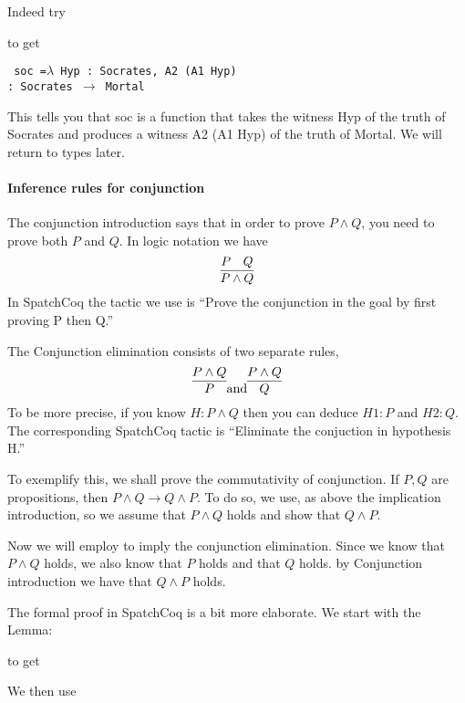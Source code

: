 \begin{itemize}
\begin{tcolorbox}[colback=red!5!white,colframe=black]
 
 \end{tcolorbox}
Indeed try

to get 

\texttt{
soc =$ \lambda$ Hyp : Socrates, A2 (A1 Hyp) \\
     : Socrates $\rightarrow$ Mortal}

This tells you  that soc is a function  that takes the witness Hyp of the truth of Socrates and produces a witness A2 (A1 Hyp) of the truth of Mortal.
 We will return to types later.





\paragraph{\bf Inference rules for conjunction}
The conjunction introduction says that in order to prove $P\land Q$, you need to prove both $P$ and $Q$. In logic notation we have
$$\infer{P\land Q}{P & Q}$$
In SpatchCoq the tactic we use is ``Prove the conjunction in the goal by first proving P then Q.''

The Conjunction elimination consists of  two separate rules,
$$\infer{P}{P\land Q} \mbox{and} \infer{Q}{P\land Q}$$ To be more precise, if you know $H:P\land Q$ then you can deduce $H1:P$ and $H2:Q$. The corresponding SpatchCoq tactic is ``Eliminate the conjuction in hypothesis H.''

To exemplify this, we shall prove the commutativity of conjunction.
If $P,Q$ are propositions, then $P\land Q \rightarrow Q \land P$. To do so, we use, as above the implication introduction, so we assume that $P\land Q$ holds and show that $Q\land P$. 

Now we will employ to imply the conjunction elimination. Since we know that $P\land Q$ holds, we also know that $P$ holds and that $Q$ holds. by Conjunction introduction we have that $Q\land P$ holds.

The formal proof in SpatchCoq is a bit more elaborate. We start with the Lemma:

to get 

We then use


\end{itemize}
